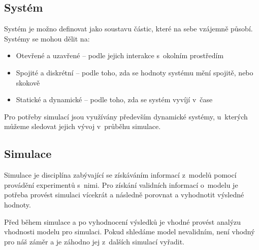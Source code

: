 \subsection{Systém}
Systém je možno definovat jako soustavu částic, které na sebe vzájemně působí. Systémy se mohou dělit na:

\begin{itemize}
    \item Otevřené a uzavřené -- podle jejich interakce s~okolním prostředím
    \item Spojité a diskrétní -- podle toho, zda se hodnoty systému mění spojitě, nebo skokově
    \item Statické a dynamické -- podle toho, zda se systém vyvíjí v~čase
\end{itemize}
Pro potřeby simulací jsou využívány především dynamické systémy, u~kterých můžeme sledovat jejich vývoj v~průběhu simulace.

\subsection{Simulace}
Simulace je disciplína zabývající se získáváním informací z~modelů pomocí provádění experimentů s~nimi. Pro získání validních informací o~modelu je potřeba provést simulaci vícekrát a následně porovnat a vyhodnotit výsledné hodnoty.

Před během simulace a po vyhodnocení výsledků je vhodné provést analýzu vhodnosti modelu pro simulaci. Pokud shledáme model nevalidním, není vhodný pro náš záměr a je záhodno jej z~dalších simulací vyřadit.


